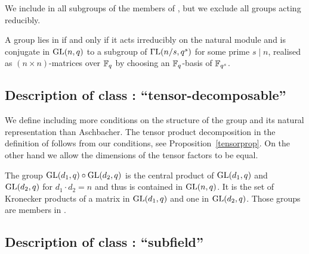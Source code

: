 \medskip
{}
We include in  all subgroups of the members of , but we exclude all
groups acting reducibly.

\smallskip
\stru
A group lies in  if and only if it acts irreducibly on the natural
module and is conjugate in $\GL(n,q)$ to a subgroup of $\GGL(n/s,q^s)$ for
some prime $s \mid n$, realised as $(n \times n)$-matrices over $\mathbb{F}_q$
by choosing an $\mathbb{F}_q$-basis of $\mathbb{F}_{q^s}$.


\subsection{Description of class : ``tensor-decomposable''}
\label{descC4}


We define  including more conditions on the structure of the
group and its natural representation than Aschbacher. The tensor
product decomposition in the definition of  follows from our
conditions, see Proposition~\ref{tensorprop}. On the other
hand we allow the dimensions of the tensor factors to be equal.

\smallskip
\exmemb
The group $\GL(d_1,q) \circ \GL(d_2,q)$ is the central
product of $\GL(d_1,q)$ and $\GL(d_2,q)$ for $d_1 \cdot d_2 = n$ and
thus is contained in $\GL(n,q)$. It is
the set of Kronecker products of a matrix in $\GL(d_1,q)$ and one in
$\GL(d_2,q)$. Those groups are members in .


\subsection{Description of class : ``subfield''}
\label{descC5}


